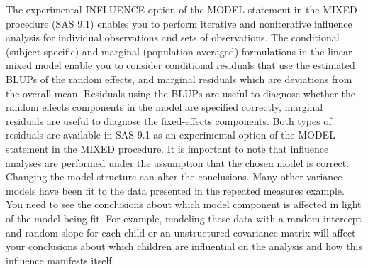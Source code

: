 \documentclass[Main.tex]{subfiles}
\begin{document}
The experimental INFLUENCE
option of the MODEL statement in the MIXED procedure (SAS 9.1) enables you to perform iterative and
noniterative influence analysis for individual observations and sets of observations.
The conditional (subject-specific) and marginal (population-averaged) formulations in the linear mixed model
enable you to consider conditional residuals that use the estimated BLUPs of the random effects, and
marginal residuals which are deviations from the overall mean. Residuals using the BLUPs are useful to
diagnose whether the random effects components in the model are specified correctly, marginal residuals
are useful to diagnose the fixed-effects components. Both types of residuals are available in SAS 9.1 as an
experimental option of the MODEL statement in the MIXED procedure.
It is important to note that influence analyses are performed under the assumption that the chosen model
is correct. Changing the model structure can alter the conclusions. Many other variance models have been
fit to the data presented in the repeated measures example. You need to see the conclusions about which
model component is affected in light of the model being fit. For example, modeling these data with a random
intercept and random slope for each child or an unstructured covariance matrix will affect your conclusions
about which children are influential on the analysis and how this influence manifests itself.


\newpage

	
\end{document}
